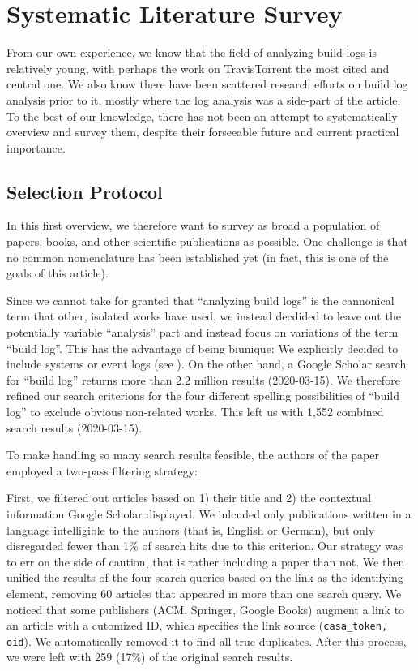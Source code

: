 \section{Systematic Literature Survey}
\label{sec:survey}
From our own experience, we know that the field of analyzing build
logs is relatively young, with perhaps the work on TravisTorrent the
most cited and central one. We also know there have been scattered
research efforts on build log analysis prior to it, mostly where the
log analysis was a side-part of the article. To the best of our
knowledge, there has not been an attempt to systematically overview
and survey them, despite their forseeable future and current practical
importance.


\subsection{Selection Protocol}
In this first overview, we therefore want to survey as broad a
population of papers, books, and other scientific publications as
possible. One challenge is that no common nomenclature has been
established yet (in fact, this is one of the goals of this
article).

Since we cannot take for granted that ``analyzing build logs'' is the
cannonical term that other, isolated works have used, we instead
decdided to leave out the potentially variable ``analysis'' part and
instead focus on variations of the term ``build log''. This has the
advantage of being biunique: We explicitly decided to include systems
or event logs (see ). On the other hand, a Google Scholar
search for ``build log'' returns more than 2.2 million results
(2020-03-15). We therefore refined our search criterions for the four
different spelling possibilities of ``build log'' to exclude obvious
non-related works. This left us with 1,552 combined search results
(2020-03-15).

To make handling so many search results feasible, the authors of the
paper employed a two-pass filtering strategy:

First, we filtered out articles based on 1) their title and 2) the
contextual information Google Scholar displayed. We inlcuded only
publications written in a language intelligible to the authors (that
is, English or German), but only disregarded fewer than 1\% of search
hits due to this criterion. Our strategy was to err on the side of
caution, that is rather including a paper than not. We then unified
the results of the four search queries based on the link as the
identifying element, removing 60 articles that appeared in more than
one search query. We noticed that some publishers (ACM, Springer,
Google Books) augment a link to an article with a cutomized ID, which
specifies the link source ({\tt casa\_token, oid}). We automatically
removed it to find all true duplicates. After this process, we were
left with 259 (17\%) of the original search results.

